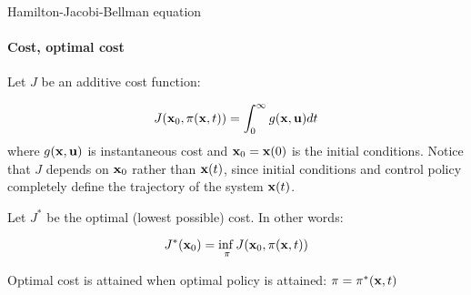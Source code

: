 \documentclass{beamer}
\begin{document}
\begin{frame}{Hamilton-Jacobi-Bellman equation}
\framesubtitle{Cost, optimal cost}
\begin{flushleft}

Let $J$ be an additive cost function:

\begin{equation}
J (\mathbf{x}_0, \pi (\mathbf{x}, t)) = \int_0^\infty g(\mathbf{x}, \mathbf{u}) dt
\end{equation}
%
where $g(\mathbf{x}, \mathbf{u})$ is instantaneous cost and $\mathbf{x}_0 = \mathbf{x}(0)$ is the initial conditions. Notice that $J$ depends on $\mathbf{x}_0$ rather than $\mathbf{x}(t)$, since initial conditions and control policy completely define the trajectory of the system $\mathbf{x}(t)$.


\bigskip

Let $J^*$ be the optimal (lowest possible) cost. In other words:

\begin{equation}
J^*(\mathbf{x}_0) = \underset{\pi}{\inf{}} J(\mathbf{x}_0, \pi (\mathbf{x}, t))
\end{equation}

Optimal cost is attained when optimal policy is attained: $\pi = \pi^*(\mathbf{x}, t)$

\end{flushleft}
\end{frame}





%
%
%
%
%
%
%
%
%
\end{document}
